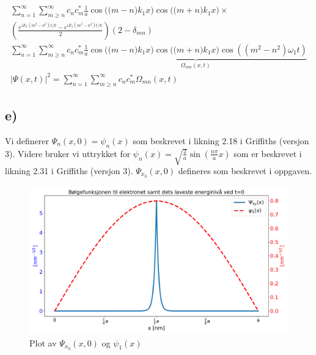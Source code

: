 \documentclass[norsk]{article}
\begin{document}
\begin{align}
∑_{n=1}^{∞} ∑_{m \ge n}^{∞} c_n c_m^{*} \frac{1}{a} \cos \Big(\big(m-n\big)k_1x\Big) \cos \Big(\big(m+n\big)k_1x\Big) × \\ \left(\frac{e^{iE_1(m^2 - n^2)t / ℏ} - e^{iE_1(m^2-n^2)t / ℏ}}{2}\right)(2-δ_{mn}) \nonumber \\ 
∑_{n=1}^{∞} ∑_{m \ge n}^{∞} c_n c_m^{*} \underbrace{\frac{1}{a} \cos \Big(\big(m-n\big)k_1x\Big) \cos \Big(\big(m+n\big)k_1x\Big) \cos ((m^2- n^2)ω_1t)}_{Ω_{mn}(x,t)} \\ 
\left|Ψ(x,t)\right|^2 = \sum_{n=1}^{∞} \sum_{m \ge n}^{∞} c_n c_m^{*} Ω_{mn}(x,t)
\end{align}


\newpage
\subsection*{e)}
Vi definerer $Ψ_n(x,0) = ψ_n(x)$ som beskrevet i likning 2.18 i Griffiths (versjon 3). Videre bruker vi uttrykket for $\displaystyle ψ_n(x) = \sqrt{\frac{2}{a}}\sin \left(\frac{nπ}{a}x\right) $ som er beskrevet i likning 2.31 i Griffiths (versjon 3). $Ψ_{x_0}(x,0)$ defineres som beskrevet i oppgaven. 
\begin{figure}[h!]
  \centering
  \includegraphics[width = \textwidth]{Midtveis.pdf}
  \caption{Plot av $Ψ_{x_0}(x,0)$ og $ψ_1(x)$}
  \label{fig: 3.e}
\end{figure}
\end{document}
